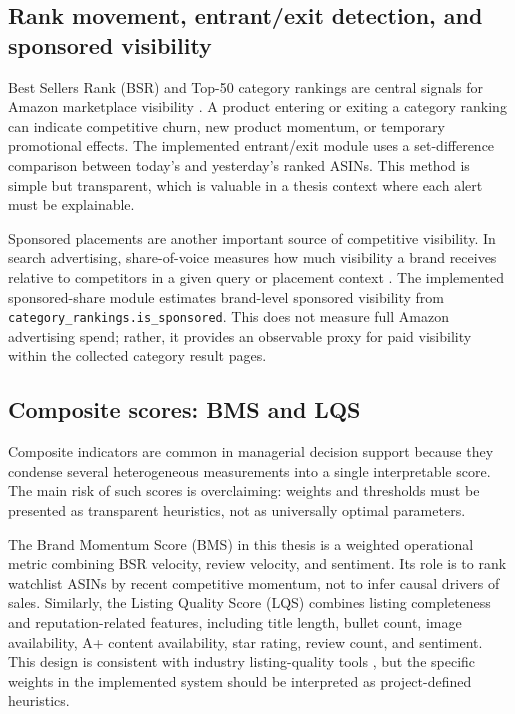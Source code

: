 \subsection{Rank movement, entrant/exit detection, and sponsored visibility}

Best Sellers Rank (BSR) and Top-50 category rankings are central signals
for Amazon marketplace visibility \citep{amazon2024bsr}. A product
entering or exiting a category ranking can indicate competitive churn,
new product momentum, or temporary promotional effects. The implemented
entrant/exit module uses a set-difference comparison between today's and
yesterday's ranked ASINs. This method is simple but transparent, which is
valuable in a thesis context where each alert must be explainable.

Sponsored placements are another important source of competitive
visibility. In search advertising, share-of-voice measures how much
visibility a brand receives relative to competitors in a given query or
placement context \citep{ghose2009}. The implemented sponsored-share
module estimates brand-level sponsored visibility from
\texttt{category\_rankings.is\_sponsored}. This does not measure full
Amazon advertising spend; rather, it provides an observable proxy for
paid visibility within the collected category result pages.

\subsection{Composite scores: BMS and LQS}

Composite indicators are common in managerial decision support because
they condense several heterogeneous measurements into a single
interpretable score. The main risk of such scores is overclaiming:
weights and thresholds must be presented as transparent heuristics, not
as universally optimal parameters.

The Brand Momentum Score (BMS) in this thesis is a weighted operational
metric combining BSR velocity, review velocity, and sentiment. Its role
is to rank watchlist ASINs by recent competitive momentum, not to infer
causal drivers of sales. Similarly, the Listing Quality Score (LQS)
combines listing completeness and reputation-related features, including
title length, bullet count, image availability, A+ content availability,
star rating, review count, and sentiment. This design is consistent with
industry listing-quality tools \citep{amazon2024listing,
helium10listing, junglescout2024}, but the specific weights in the
implemented system should be interpreted as project-defined heuristics.

